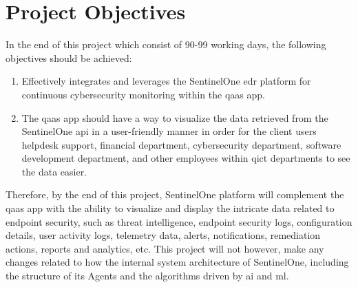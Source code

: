 \section{Project Objectives}
In the end of this project which consist of 90-99 working days, the following objectives should be achieved:
\begin{enumerate}
      \item Effectively integrates and leverages the SentinelOne \acrshort{edr} platform for continuous
            cybersecurity monitoring within the \acrshort{qaas} app.
      \item The \acrshort{qaas} app should have a way to visualize the data retrieved from the SentinelOne
            \acrshort{api} in a user-friendly manner in order for the client users helpdesk support, financial
            department, cybersecurity department, software development department, and other employees within
            \acrshort{qict}  departments to see the data easier.
\end{enumerate}
Therefore, by the end of this project, SentinelOne platform will complement the \acrshort{qaas} app with the ability to
visualize and display the intricate data related to endpoint security, such as threat intelligence, endpoint
security logs, configuration details, user activity logs, telemetry data, alerts, notifications, remediation
actions, reports and analytics, \acrshort{etc}.  This project will not however, make any changes related to how
the internal system architecture of SentinelOne, including the structure of its Agents and the algorithms driven by
\acrshort{ai} and \acrshort{ml}.

